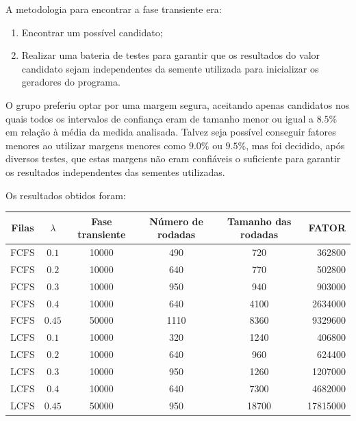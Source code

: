 \documentclass[a4paper,10pt]{article}
\begin{document}
A metodologia para encontrar a fase transiente era:
\begin{enumerate}
	\item Encontrar um possível candidato;
	\item Realizar uma bateria de testes para garantir que os resultados do valor candidato sejam independentes da semente utilizada para inicializar os geradores do programa.
\end{enumerate}

    O grupo preferiu optar por uma margem segura, aceitando apenas candidatos nos quais todos os intervalos de confiança eram de tamanho menor ou igual a $8.5\%$ em relação à média da medida analisada. Talvez seja possível conseguir fatores menores ao utilizar margens menores como $9.0\%$ ou $9.5\%$, mas foi decidido, após diversos testes, que estas margens não eram confiáveis o suficiente para garantir os resultados independentes das sementes utilizadas.

Os resultados obtidos foram:

\begin{center}
\begin{tabular} { | c | c | c | c | c | r | }
    \hline
    Filas & $\lambda$  & Fase transiente  & Número de rodadas & Tamanho das rodadas  & FATOR \\ \hline
    FCFS     & $0.1$   & 10000 & 490     & 720      & 362800       \\ \hline
    FCFS     & $0.2$   & 10000 & 640     & 770      & 502800       \\ \hline
    FCFS     & $0.3$   & 10000 & 950     & 940      & 903000       \\ \hline
    FCFS     & $0.4$   & 10000 & 640     & 4100    & 2634000     \\ \hline
    FCFS     & $0.45$ & 50000 & 1110   & 8360    & 9329600     \\ \hline
    LCFS     & $0.1$   & 10000 & 320     & 1240    & 406800       \\ \hline
    LCFS     & $0.2$   & 10000 & 640     & 960      & 624400       \\ \hline
    LCFS     & $0.3$   & 10000 & 950     & 1260    & 1207000     \\ \hline
    LCFS     & $0.4$   & 10000 & 640     & 7300    & 4682000     \\ \hline
    LCFS     & $0.45$ & 50000 & 950     & 18700  & 17815000   \\ \hline
\end{tabular}
\end{center}
\end{document}
